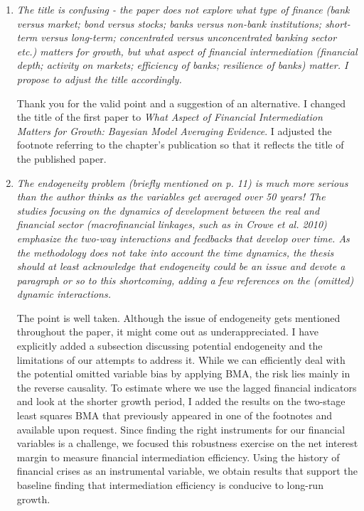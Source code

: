 \begin{enumerate}
       
    \item \textit{The title is confusing - the paper does not explore what type of finance (bank versus market; bond versus stocks; banks versus non-bank institutions; short-term versus long-term; concentrated versus unconcentrated banking sector etc.) matters for growth, but what aspect of financial intermediation (financial depth; activity on markets; efficiency of banks; resilience of banks) matter. I propose to adjust the title accordingly.}
    
    Thank you for the valid point and a suggestion of an alternative. I changed the title of the first paper to \emph{What Aspect of Financial Intermediation Matters for Growth: Bayesian Model Averaging Evidence}. I adjusted the footnote referring to the chapter's publication so that it reflects the title of the published paper.

    \item \textit{The endogeneity problem (briefly mentioned on p. 11) is much more serious than the author thinks as the variables get averaged over 50 years! The studies focusing on the dynamics of development between the real and financial sector (macrofinancial linkages, such as in Crowe et al. 2010) emphasize the two-way interactions and feedbacks that develop over time. As the methodology does not take into account the time dynamics, the thesis should at least acknowledge that endogeneity could be an issue and devote a paragraph or so to this shortcoming, adding a few references on the (omitted) dynamic interactions.}
    
    The point is well taken. Although the issue of endogeneity gets mentioned throughout the paper, it might come out as underappreciated. I have explicitly added a subsection discussing potential endogeneity and the limitations of our attempts to address it. While we can efficiently deal with the potential omitted variable bias by applying \ac{BMA}, the risk lies mainly in the reverse causality. To estimate where we use the lagged financial indicators and look at the shorter growth period, I added the results on the two-stage least squares \ac{BMA} that previously appeared in one of the footnotes and available upon request. Since finding the right instruments for our financial variables is a challenge, we focused this robustness exercise on the net interest margin to measure financial intermediation efficiency. Using the history of financial crises as an instrumental variable, we obtain results that support the baseline finding that intermediation efficiency is conducive to long-run growth.
    

\end{enumerate}
